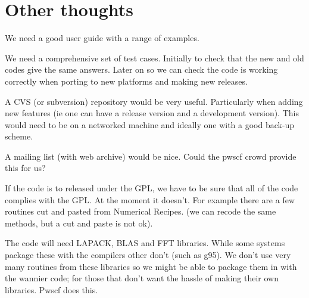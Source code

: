 \chapter{Other thoughts}

We need a good user guide with a range of examples.

We need a comprehensive set of test cases. Initially to check that the new
and old codes give the same answers. Later on so we can check the code is
working correctly when porting to new platforms and making new releases.

A CVS (or subversion) repository would be very useful. Particularly when
adding new features (ie one can have a release version and a development
version). This would need to be on a networked machine and ideally one
with a good back-up scheme.

A mailing list (with web archive) would be nice. Could the pwscf crowd
provide this for us?

If the code is to released under the GPL, we have to be sure that all of
the code complies with the GPL. At the moment it doesn't. For example
there are a few routines cut and pasted from Numerical Recipes. (we can
recode the same methods, but a cut and paste is not ok).

The code will need LAPACK, BLAS and FFT libraries. While some systems
package these with the compilers other don't (such as g95). We don't use
very many routines from these libraries so we
might be able to package them in with the wannier code; for those that
don't want the hassle
of making their own libraries. Pwscf does this.
